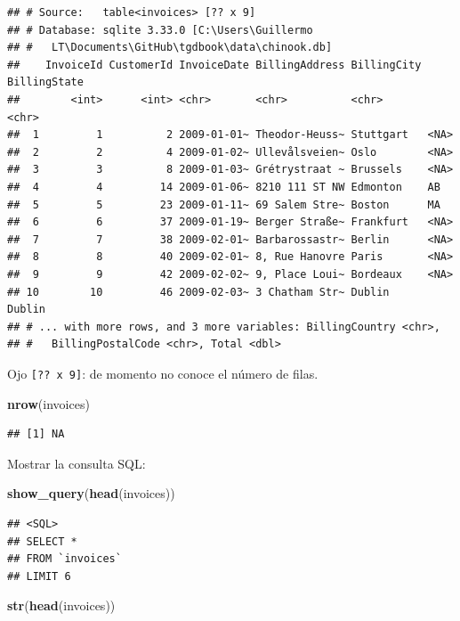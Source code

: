 \documentclass[
]{book}
\newenvironment{Shaded}{\begin{snugshade}}{\end{snugshade}}
\newcommand{\KeywordTok}[1]{\textcolor[rgb]{0.13,0.29,0.53}{\textbf{#1}}}
\newcommand{\NormalTok}[1]{#1}
\begin{document}
\begin{verbatim}
## # Source:   table<invoices> [?? x 9]
## # Database: sqlite 3.33.0 [C:\Users\Guillermo
## #   LT\Documents\GitHub\tgdbook\data\chinook.db]
##    InvoiceId CustomerId InvoiceDate BillingAddress BillingCity BillingState
##        <int>      <int> <chr>       <chr>          <chr>       <chr>       
##  1         1          2 2009-01-01~ Theodor-Heuss~ Stuttgart   <NA>        
##  2         2          4 2009-01-02~ Ullevålsveien~ Oslo        <NA>        
##  3         3          8 2009-01-03~ Grétrystraat ~ Brussels    <NA>        
##  4         4         14 2009-01-06~ 8210 111 ST NW Edmonton    AB          
##  5         5         23 2009-01-11~ 69 Salem Stre~ Boston      MA          
##  6         6         37 2009-01-19~ Berger Straße~ Frankfurt   <NA>        
##  7         7         38 2009-02-01~ Barbarossastr~ Berlin      <NA>        
##  8         8         40 2009-02-01~ 8, Rue Hanovre Paris       <NA>        
##  9         9         42 2009-02-02~ 9, Place Loui~ Bordeaux    <NA>        
## 10        10         46 2009-02-03~ 3 Chatham Str~ Dublin      Dublin      
## # ... with more rows, and 3 more variables: BillingCountry <chr>,
## #   BillingPostalCode <chr>, Total <dbl>
\end{verbatim}

Ojo \texttt{{[}??\ x\ 9{]}}: de momento no conoce el número de filas.

\begin{Shaded}
\begin{Highlighting}[]
\KeywordTok{nrow}\NormalTok{(invoices)}
\end{Highlighting}
\end{Shaded}

\begin{verbatim}
## [1] NA
\end{verbatim}

Mostrar la consulta SQL:

\begin{Shaded}
\begin{Highlighting}[]
\KeywordTok{show_query}\NormalTok{(}\KeywordTok{head}\NormalTok{(invoices))}
\end{Highlighting}
\end{Shaded}

\begin{verbatim}
## <SQL>
## SELECT *
## FROM `invoices`
## LIMIT 6
\end{verbatim}

\begin{Shaded}
\begin{Highlighting}[]
\KeywordTok{str}\NormalTok{(}\KeywordTok{head}\NormalTok{(invoices))}
\end{Highlighting}
\end{Shaded}
\end{document}
